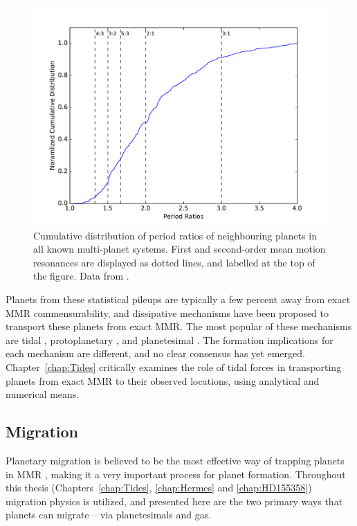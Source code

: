 \begin{figure}
\centering
\includegraphics[width=1.00\textwidth]{intro/PeriodRatios}
\caption{
Cumulative distribution of period ratios of neighbouring planets in all known multi-planet systems.
 First and second-order mean motion resonances are displayed as dotted lines, and labelled at the top of the figure. 
 Data from \citet{NASAEA}.}
\label{fig:KepMMR}
\end{figure}

Planets from these statistical pileups are typically a few percent away from exact MMR commensurability, and dissipative mechanisms have been proposed to transport these planets from exact MMR. 
The most popular of these mechanisms are tidal \citep{LithwickWu2012, Batygin2013, Delisle2014}, protoplanetary \citep{Rein2012b, Baruteau2013, Goldreich2014}, and planetesimal \citep{Moore2013, Chatterjee2015}.
The formation implications for each mechanism are different, and no clear consensus has yet emerged.
Chapter~\ref{chap:Tides} critically examines the role of tidal forces in transporting \kep planets from exact MMR to their observed locations, using analytical and numerical means. 

\subsection{Migration}
\label{sec:migration}
Planetary migration is believed to be the most effective way of trapping planets in MMR \citep[e.g.][]{Lee2002}, making it a very important process for planet formation.  
Throughout this thesis (Chapters~\ref{chap:Tides}, \ref{chap:Hermes} and \ref{chap:HD155358}) migration physics is utilized, and presented here are the two primary ways that planets can migrate -- via planetesimals and gas.

